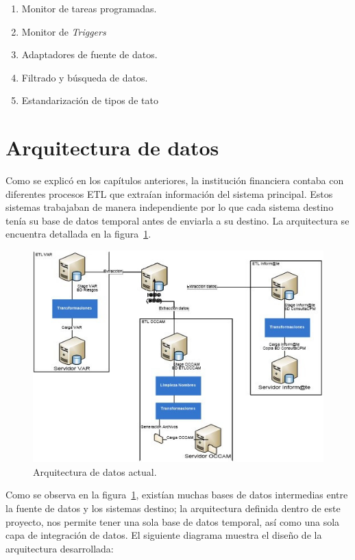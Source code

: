 \begin{enumerate}
\item Monitor de tareas programadas.
\item Monitor de \textit{Triggers}
\item Adaptadores de fuente de datos.
\item Filtrado y búsqueda de datos.
\item Estandarización de tipos de tato

\end{enumerate}

\section{Arquitectura de datos}

Como se explicó en los capítulos anteriores, la institución financiera contaba
con diferentes procesos ETL que extraían información del sistema
principal. Estos sistemas trabajaban de manera independiente por lo que cada
sistema destino tenía su base de datos temporal antes de enviarla a su
destino. La arquitectura se encuentra detallada en la
figura~\ref{fig:arquitectura-de-datos-actual}.

\begin{figure}[htb]
  \begin{center}
    \includegraphics[width=0.8\linewidth]{Arquitecturadatos_actual.jpg}
    \caption{Arquitectura de datos actual.}
    \label{fig:arquitectura-de-datos-actual}
  \end{center}
\end{figure}

Como se observa en la figura~\ref{fig:arquitectura-de-datos-actual}, existían
muchas bases de datos intermedias entre la fuente de datos y los sistemas
destino; la arquitectura definida dentro de este proyecto, nos permite tener una
sola base de datos temporal, así como una sola capa de integración de datos. El
siguiente diagrama muestra el diseño de la arquitectura desarrollada:

